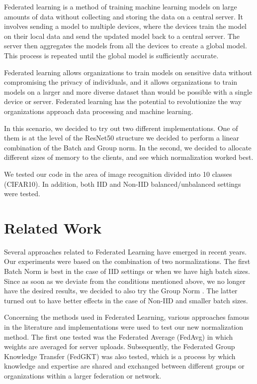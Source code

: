 \documentclass[conference]{IEEEtran}
\begin{document}
Federated learning is a method of training machine learning models on large amounts of data without collecting and storing the data on a central server. It involves sending a model to multiple devices, where the devices train the model on their local data and send the updated model back to a central server. The server then aggregates the models from all the devices to create a global model. This process is repeated until the global model is sufficiently accurate. 

Federated learning allows organizations to train models on sensitive data without compromising the privacy of individuals, and it allows organizations to train models on a larger and more diverse dataset than would be possible with a single device or server. Federated learning has the potential to revolutionize the way organizations approach data processing and machine learning\cite{b1}.

In this scenario, we decided to try out two different implementations. One of them is at the level of the ResNet50 structure we decided to perform a linear combination of the Batch and Group norm. In the second, we decided to allocate different sizes of memory to the clients, and see which normalization worked best.

We tested our code in the area of image recognition divided into 10 classes (CIFAR10). In addition, both IID and Non-IID balanced/unbalanced settings were tested.

\section{Related Work}

Several approaches related to Federated Learning have emerged in recent years. Our experiments were based on the combination of two normalizations. The first Batch Norm \cite{b2} is best in the case of IID settings or when we have high batch sizes. Since as soon as we deviate from the conditions mentioned above, we no longer have the desired results, we decided to also try the Group Norm \cite{b3}. The latter turned out to have better effects in the case of Non-IID and smaller batch sizes.

Concerning the methods used in Federated Learning, various approaches famous in the literature and implementations were used to test our new normalization method. The first one tested was the Federated Average (FedAvg) \cite{b4} in which weights are averaged for server uploads. Subsequently, the Federated Group Knowledge Transfer (FedGKT)\cite{b5}  was also tested, which is a process by which knowledge and expertise are shared and exchanged between different groups or organizations within a larger federation or network.
\end{document}
